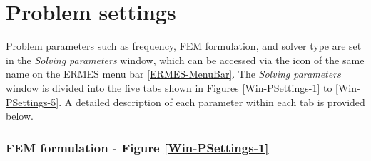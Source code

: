 \section{Problem settings}\label{ProblemSettings}

Problem parameters such as frequency, FEM formulation, and solver type are set in the \textit{Solving parameters} window, which can be accessed via the icon of the same name on the ERMES menu bar \ref{ERMES-MenuBar}. The \textit{Solving parameters} window is divided into the five tabs shown in Figures \ref{Win-PSettings-1} to \ref{Win-PSettings-5}. A detailed description of each parameter within each tab is provided below.

\subsubsection{FEM formulation - Figure \ref{Win-PSettings-1}}\label{GeneralSettings}

